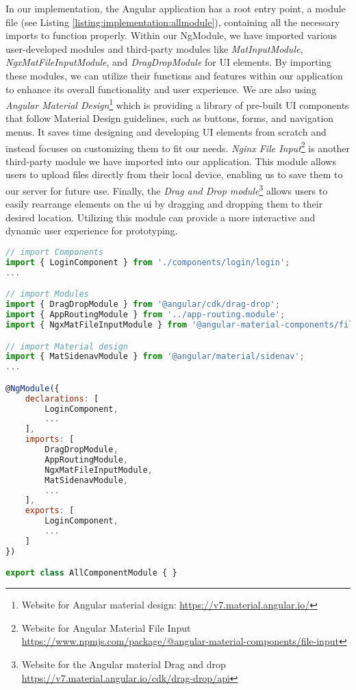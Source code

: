 In our implementation, the Angular application has a root entry point, a module file (see Listing \ref{listing:implementation:allmodule}), containing all the necessary imports to function properly. 
Within our NgModule, we have imported various user-developed modules and third-party modules like \textit{MatInputModule}, \textit{NgxMatFileInputModule}, and \textit{DragDropModule} for UI elements. 
By importing these modules, we can utilize their functions and features within our application to enhance its overall functionality and user experience.
We are also using \textit{Angular Material Design}\footnote{Website for Angular material design: \url{https://v7.material.angular.io/}} which is providing a library of pre-built UI components that follow Material Design guidelines, such as buttons, forms, and navigation menus. 
It saves time designing and developing UI elements from scratch and instead focuses on customizing them to fit our needs.
\textit{Nginx File Input}\footnote{Website for Angular Material File Input \url{https://www.npmjs.com/package/@angular-material-components/file-input}} is another third-party module we have imported into our application. 
This module allows users to upload files directly from their local device, enabling us to save them to our server for future use.
Finally, the \textit{Drag and Drop module}\footnote{Website for the Angular material Drag and drop \url{https://v7.material.angular.io/cdk/drag-drop/api}} allows users to easily rearrange elements on the \ac{ui} by dragging and dropping them to their desired location. 
Utilizing this module can provide a more interactive and dynamic user experience for prototyping.

\begin{lstlisting}[language=JavaScript, caption=The File Defining All the Modules, label=listing:implementation:allmodule]
// import Components
import { LoginComponent } from './components/login/login';
...

// import Modules
import { DragDropModule } from '@angular/cdk/drag-drop';
import { AppRoutingModule } from '../app-routing.module';
import { NgxMatFileInputModule } from '@angular-material-components/file-input';

// import Material design
import { MatSidenavModule } from '@angular/material/sidenav';
...

@NgModule({
    declarations: [
        LoginComponent,
        ...
    ],
    imports: [
        DragDropModule,
        AppRoutingModule,
        NgxMatFileInputModule,
        MatSidenavModule,
        ...
    ],
    exports: [
        LoginComponent, 
        ...
    ]
})

export class AllComponentModule { }
\end{lstlisting}

